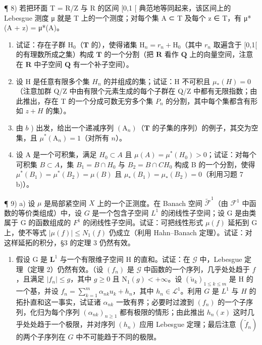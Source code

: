 ¶ 8) 若把环面 T = R/Z 与 R 的区间 {[}0,1 {[} 典范地等同起来，该区间上的 Lebesgue 测度 μ 就是 T 上的一个测度；对每个集 A ⊂ T 及每个 z ∈ T，有 μ*(A + z) = μ*(A)。

\begin{enumerate}
\def\labelenumi{\alph{enumi})}
\item
  试证：存在子群 \(\mathrm{H}_0\)（\(\mathbf{T}\) 的），使得诸集 \(\mathrm{H}_n = r_n + \mathrm{H}_0\)（其中 \(r_n\) 取遍含于 {[}0,1{[} 的有理数所成之集）构成 \(\mathbf{T}\) 的一个分割（把 \(\mathbf{R}\) 看作 \(\mathbf{Q}\) 上的向量空间，注意在 \(\mathbf{R}\) 中子空间 \(\mathbf{Q}\) 有一个补子空间）。
\item
  设 H 是任意有限多个集 \(H_{n}\) 的并组成的集；试证：H 不可积且 \(\mu_{*}(H)=0\)（注意加群 Q/Z 中由有限个元素生成的每个子群在 Q/Z 中都有无限指数；由此推出，存在 T 的一个分成可数无穷多个集 \(P_{n}\) 的分割，其中每个集都含有形如 \(z+H\) 的集）。
\item
  由 \(b\) ) 出发，给出一个递减序列 \((\mathrm{A}_n)\)（\(\mathbf{T}\) 的子集的序列）的例子，其交为空集，且 \(\mu^{*}(\mathrm{A}_{n}) = 1\)（对所有 \(n\)）。
\item
  设 A 是一个可积集，满足 \(H_{0} \subset A\) 且 \(\mu(A) = \mu^{*}(H_{0}) > 0\)；试证：对每个可积集 \(B \subset A\)，集 \(B_{1} = B \cap H_{0}\) 与 \(B_{2} = B \cap C H_{0}\) 构成 B 的一个分割，使得 \(\mu^{*}(B_{1}) = \mu^{*}(B_{2}) = \mu(B)\) 且 \(\mu_{*}(B_{1}) = \mu_{*}(B_{2}) = 0\)（利用习题 7 b)）。
\end{enumerate}

¶ 9) a) 设 \(\mu\) 是局部紧空间 \(X\) 上的一个正测度。在 Banach 空间 \(\widetilde{\mathcal{F}}^1\)（由 \(\mathcal{F}^1\) 中函数的等价类组成）中，设 \(G\) 是一个包含子空间 \(L^{1}\) 的闭线性子空间；设 G 是由类属于 G 的函数组成的 \(F^{1}\) 的闭线性子空间。试证：可把线性形式 \(\mu(f)\) 延拓到 G 上，使不等式 \(|\mu(f)| \leqslant N_{1}(f)\) 仍成立（利用 Hahn--Banach 定理）。试证：对这样延拓的积分，§3 的定理 3 仍然有效。

\begin{enumerate}
\def\labelenumi{\alph{enumi})}
\setcounter{enumi}{1}
\tightlist
\item
  假设 G 是 \(\mathbf{L}^1\) 与一个有限维子空间 H 的直和。试证：在 \(\mathcal{G}\) 中，Lebesgue 定理（定理 2）仍然有效。（设 \((f_n)\) 是 \(\mathcal{G}\) 中函数的一个序列，几乎处处趋于 \(f\)，且满足 \(|f_n| \leqslant g\)，其中 \(g \geqslant 0\) 且 \(\mathrm{N}_1(g) < +\infty\)。设 \((\widetilde{u}_k)_{1 \leqslant k \leqslant m}\) 是 H 的一个基，并设 \(f_n = \sum_{k=1}^{m} \alpha_{nk} u_k + h_n\)，其中 \(h_n \in \mathcal{L}^1\)。利用 \(G\) 是 \(L^1\) 与 \(H\) 的拓扑直和这一事实，试证诸 \(\alpha_{nk}\) 一致有界；必要时过渡到 \((f_n)\) 的一个子序列，化归为每个序列 \((\alpha_{nk})_{n \geqslant 1}\) 都有极限的情形；由此推出 \(h_n(x)\) 这时几乎处处趋于一个极限，并对序列 \((h_n)\) 应用 Lebesgue 定理；最后注意 \((\widetilde{f}_n)\) 的两个子序列在 \(G\) 中不可能趋于不同的极限。
\end{enumerate}


